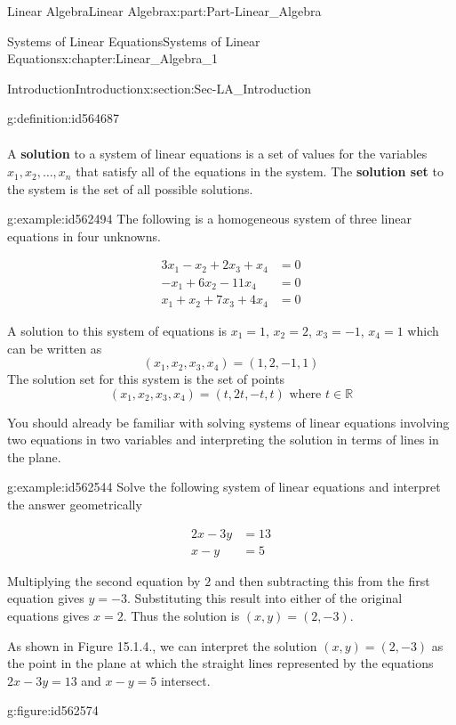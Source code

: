 \documentclass[oneside,10pt,]{book}
\newcommand{\terminology}[1]{\textbf{#1}}
\numberwithin{equation}{section}
\newcommand{\amp}{&}
\begin{document}
\begin{partptx}{Linear Algebra}{}{Linear Algebra}{}{}{x:part:Part-Linear_Algebra}
\begin{chapterptx}{Systems of Linear Equations}{}{Systems of Linear Equations}{}{}{x:chapter:Linear_Algebra_1}
\begin{sectionptx}{Introduction}{}{Introduction}{}{}{x:section:Sec-LA_Introduction}
\begin{definition}{}{g:definition:id564687}
\begin{align*}
\end{align*}
%
\end{definition}
A \terminology{solution} to a system of linear equations is a set of values for the variables \(x_1, x_2, \dots, x_n\) that satisfy all of the equations in the system. The \terminology{solution set} to the system is the set of all possible solutions.%
\begin{example}{}{g:example:id562494}%
The following is a homogeneous system of three linear equations in four unknowns.%
\par
%
\begin{align*}
3x_1-x_2+2x_3+x_4 \amp =0\\
-x_1+6x_2-11x_4 \amp =0\\
x_1+x_2+7x_3+4x_4 \amp =0
\end{align*}
%
\par
A solution to this system of equations is \(x_1=1\), \(x_2=2\), \(x_3=-1\), \(x_4=1\) which can be written as%
\begin{equation*}
(x_1,x_2,x_3,x_4)=(1,2,-1,1)
\end{equation*}
The solution set for this system is the set of points%
\begin{equation*}
(x_1,x_2,x_3,x_4)=(t,2t,-t,t) \textrm{ where } t\in \mathbb{R}
\end{equation*}
%
\end{example}
You should already be familiar with solving systems of linear equations involving two equations in two variables and interpreting the solution in terms of lines in the plane.%
\begin{example}{}{g:example:id562544}%
Solve the following system of linear equations and interpret the answer geometrically%
\par
%
\begin{align*}
2x-3y \amp =13\\
x-y \amp =5
\end{align*}
%
\par\smallskip%
\noindent\hypertarget{g:solution:id562512}{}Multiplying the second equation by \(2\) and then subtracting this from the first equation gives \(y=-3\). Substituting this result into either of the original equations gives \(x=2\). Thus the solution is \((x,y)=(2,-3)\).%
\par
As shown in Figure 15.1.4., we can interpret the solution \((x,y)=(2,-3)\) as the point in the plane at which the straight lines represented by the equations \(2x-3y=13\) and \(x-y=5\) intersect. \begin{figureptx}{}{g:figure:id562574}{}%

\end{figureptx}
\end{example}
\end{sectionptx}
\end{chapterptx}
\end{partptx}
\end{document}
